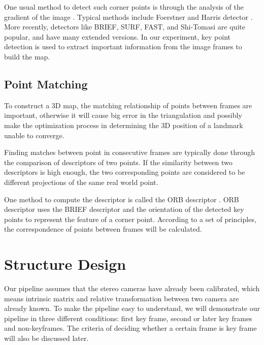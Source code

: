 \documentclass{easychair}
\begin{document}
One usual method to detect such corner points is through the analysis of the gradient of the image \cite{gradient}. Typical methods include Foerstner and Harris detector \cite{detector}. More recently, detectors like BRIEF, SURF, FAST, and Shi-Tomasi are quite popular, and have many extended versions. In our experiment, key point detection is used to extract important information from the image frames to build the map.

\subsection{Point Matching}
To construct a 3D map, the matching relationship of points between frames are important, otherwise it will cause big error in the triangulation and possibly make the optimization process in determining the 3D position of a landmark unable to converge.

Finding matches between point in consecutive frames are typically done through the comparison of descriptors of two points. If the similarity between two descriptors is high enough, the two corresponding points are considered to be different projections of the same real world point. 

One method to compute the descriptor is called the ORB descriptor \cite{orb}. ORB descriptor uses the BRIEF descriptor \cite{brief} and the orientation of the detected key points to represent the feature of a corner point. According to a set of principles, the correspondence of points between frames will be calculated.

\section{Structure Design}


Our pipeline assumes that the stereo cameras have already been calibrated, which means intrinsic matrix and relative transformation between two camera are already known. To make the pipeline easy to understand, we will demonstrate our pipeline in three different conditions: first key frame, second or later key frames and non-keyframes. The criteria of deciding whether a certain frame is key frame will also be discussed later.
\end{document}

